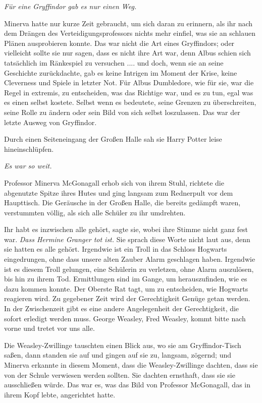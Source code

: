 \emph{Für eine Gryffindor gab es nur einen Weg.}

Minerva hatte nur kurze Zeit gebraucht, um sich daran zu erinnern, als ihr nach
dem Drängen des Verteidigungsprofessors nichts mehr einfiel, was sie an schlauen
Plänen ausprobieren konnte. Das war nicht die Art eines Gryffindors; oder
vielleicht sollte sie nur sagen, dass es nicht ihre Art war, denn Albus schien
sich tatsächlich im Ränkespiel zu versuchen .... und doch, wenn sie an seine
Geschichte zurückdachte, gab es keine Intrigen im Moment der Krise, keine
Cleverness und Spiele in letzter Not. Für Albus Dumbledore, wie für sie, war die
Regel in extremis, zu entscheiden, was das Richtige war, und es zu tun, egal was
es einen selbst kostete. Selbst wenn es bedeutete, seine Grenzen zu
überschreiten, seine Rolle zu ändern oder sein Bild von sich selbst loszulassen.
Das war der letzte Ausweg von Gryffindor.

Durch einen Seiteneingang der Großen Halle sah sie Harry Potter leise
hineinschlüpfen.

\emph{Es war so weit.}

Professor Minerva McGonagall erhob sich von ihrem Stuhl, richtete die abgenutzte
Spitze ihres Hutes und ging langsam zum Rednerpult vor dem Haupttisch. Die
Geräusche in der Großen Halle, die bereits gedämpft waren, verstummten völlig,
als sich alle Schüler zu ihr umdrehten.

\glqq{}Ihr habt es inzwischen alle gehört\grqq{}, sagte sie, wobei ihre Stimme
nicht ganz fest war. \emph{Dass Hermine Granger tot ist.} Sie sprach diese Worte
nicht laut aus, denn sie hatten es alle gehört. \glqq{}Irgendwie ist ein Troll in
das Schloss Hogwarts eingedrungen, ohne dass unsere alten Zauber Alarm
geschlagen haben. Irgendwie ist es diesem Troll gelungen, eine Schülerin zu
verletzen, ohne Alarm auszulösen, bis hin zu ihrem Tod. Ermittlungen sind im
Gange, um herauszufinden, wie es dazu kommen konnte. Der Oberste Rat tagt, um zu
entscheiden, wie Hogwarts reagieren wird. Zu gegebener Zeit wird der
Gerechtigkeit Genüge getan werden. In der Zwischenzeit gibt es eine andere
Angelegenheit der Gerechtigkeit, die sofort erledigt werden muss. George
Weasley, Fred Weasley, kommt bitte nach vorne und tretet vor uns alle.\grqq{}

Die Weasley-Zwillinge tauschten einen Blick aus, wo sie am Gryffindor-Tisch
saßen, dann standen sie auf und gingen auf sie zu, langsam, zögernd; und Minerva
erkannte in diesem Moment, dass die Weasley-Zwillinge dachten, dass sie von der
Schule verwiesen werden sollten. Sie dachten ernsthaft, dass sie sie
ausschließen würde. Das war es, was das Bild von Professor McGonagall, das in
ihrem Kopf lebte, angerichtet hatte.

